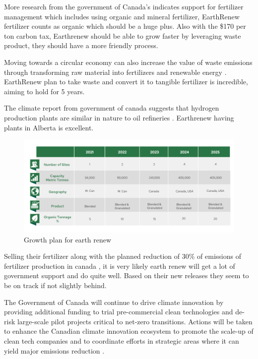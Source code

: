     
More research from the government of Canada's \cite{climate_change_2030_emissions} indicates support for fertilizer management which includes using organic and mineral fertilizer, EarthRenew fertilizer counts as organic which should be a huge plus. Also with the \$170 per ton carbon tax, Earthrenew should be able to grow faster by leveraging waste product, they should have a more friendly process.


\begin{blockquote}
Moving towards a circular economy can also increase the value of waste emissions through transforming raw material into fertilizers and renewable energy \cite{climate_change_2030_emissions}. EarthRenew plan to take waste and convert it to tangible fertilizer is incredible, aiming to hold for 5 years.
\end{blockquote}

The climate report from government of canada suggests that hydrogen production plants are similar in nature to oil refineries \cite{climate_change_2030_emissions}. Earthrenew having plants in Alberta is excellent.


\begin{figure}[h]
\includegraphics[width=\textwidth]{src/media/63894524-04fe-485b-a801-736431092c3c-e1633360733920.png}
\caption{Growth plan for earth renew}
\end{figure}

Selling their fertilizer along with the planned reduction of 30\% of emissions of fertilizer production in canada \cite{climate_change_2030_emissions}, it is very likely earth renew will get a lot of government support and do quite well. Based on their new releases they seem to be on track if not slightly behind.


\begin{blockquote}
The Government of Canada will continue to drive climate innovation by providing additional funding to
trial pre-commercial clean technologies and de-risk large-scale pilot projects critical to net-zero
transitions. Actions will be taken to enhance the Canadian climate innovation ecosystem to promote the
scale-up of clean tech companies and to coordinate efforts in strategic areas where it can yield major
emissions reduction \cite{climate_change_2030_emissions}. 
\end{blockquote}


